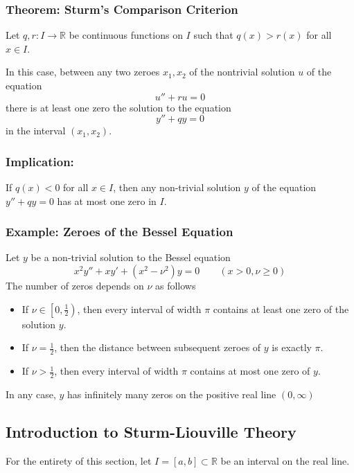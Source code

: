 \documentclass[11pt, a4paper]{article}
\newcommand{\R}{\mathbb{R}} %
\begin{document}
\subsubsection{Theorem: Sturm's Comparison Criterion}
Let $ q, r: I \to \R $ be continuous functions on $ I $ such that $ q(x) > r(x)$ for all $ x \in I $. 

In this case, between any two zeroes $ x_1, x_2 $ of the nontrivial solution $ u $ of the equation
\begin{equation*}
	u'' + r u = 0
\end{equation*}
there is at least one zero the solution to the equation
\begin{equation*}
	y'' + qy = 0
\end{equation*}
in the interval $ (x_1, x_2) $.

\subsubsection{Implication: }
If $ q(x) < 0 $ for all $ x \in I $, then any non-trivial solution $ y $ of the equation $ y'' + qy = 0 $ has at most one zero in $ I $.


\subsubsection{Example: Zeroes of the Bessel Equation}
Let $ y $ be a non-trivial solution to the Bessel equation
\begin{equation*}
	x^2 y'' + xy' + (x^2 - \nu^2)y = 0 \qquad (x > 0, \nu \geq 0)
\end{equation*}
The number of zeros depends on $ \nu $ as follows
\begin{itemize}
	\item If $ \nu \in \left [0, \frac{1}{2}\right ) $, then every interval of width $ \pi $ contains at least one zero of the solution $ y $.
	
	\item If $ \nu = \frac{1}{2} $, then the distance between subsequent zeroes of $ y $ is exactly $ \pi $.
	
	\item If $ \nu > \frac{1}{2} $, then every interval of width $ \pi $ contains at most one zero of $ y $.
\end{itemize}
In any case, $ y $ has infinitely many zeros on the positive real line $ (0, \infty) $

\subsection{Introduction to Sturm-Liouville Theory}
For the entirety of this section, let $ I = [a, b] \subset \R $ be an interval on the real line.
\end{document}
